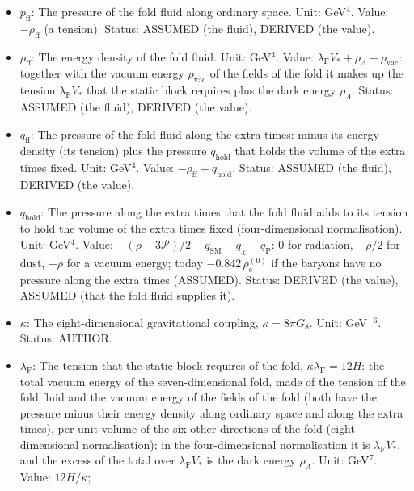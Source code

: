 \documentclass[
  10pt,
]{article}
\providecommand{\tightlist}{%
  \setlength{\itemsep}{0pt}\setlength{\parskip}{0pt}}
\begin{document}
\begin{itemize}
\tightlist
\item
  \(p_{\mathrm{ff}}\): The pressure of the fold fluid along ordinary
  space. Unit: GeV\(^4\). Value: \(-\rho_{\mathrm{ff}}\) (a tension).
  Status: ASSUMED (the fluid), DERIVED (the value).
\item
  \(\rho_{\mathrm{ff}}\): The energy density of the fold fluid. Unit:
  GeV\(^4\). Value:
  \(\lambda_{\mathrm{F}}V_* + \rho_\Lambda - \rho_{\mathrm{vac}}\):
  together with the vacuum energy \(\rho_{\mathrm{vac}}\) of the fields
  of the fold it makes up the tension \(\lambda_{\mathrm{F}}V_*\) that
  the static block requires plus the dark energy \(\rho_\Lambda\).
  Status: ASSUMED (the fluid), DERIVED (the value).
\item
  \(q_{\mathrm{ff}}\): The pressure of the fold fluid along the extra
  times: minus its energy density (its tension) plus the pressure
  \(q_{\mathrm{hold}}\) that holds the volume of the extra times fixed.
  Unit: GeV\(^4\). Value: \(-\rho_{\mathrm{ff}} + q_{\mathrm{hold}}\).
  Status: ASSUMED (the fluid), DERIVED (the value).
\item
  \(q_{\mathrm{hold}}\): The pressure along the extra times that the
  fold fluid adds to its tension to hold the volume of the extra times
  fixed (four-dimensional normalisation). Unit: GeV\(^4\). Value:
  \(-(\rho - 3\mathcal{P})/2 - q_{\mathrm{SM}} - q_\chi - q_{\mathrm{P}}\):
  0 for radiation, \(-\rho/2\) for dust, \(-\rho\) for a vacuum energy;
  today \(-0.842\,\rho_{\mathrm{c}}^{(0)}\) if the baryons have no
  pressure along the extra times (ASSUMED). Status: DERIVED (the value),
  ASSUMED (that the fold fluid supplies it).
\item
  \(\kappa\): The eight-dimensional gravitational coupling,
  \(\kappa = 8\pi G_8\). Unit: GeV\(^{-6}\). Status: AUTHOR.
\item
  \(\lambda_{\mathrm{F}}\): The tension that the static block requires
  of the fold, \(\kappa\lambda_{\mathrm{F}} = 12H\): the total vacuum
  energy of the seven-dimensional fold, made of the tension of the fold
  fluid and the vacuum energy of the fields of the fold (both have the
  pressure minus their energy density along ordinary space and along the
  extra times), per unit volume of the six other directions of the fold
  (eight-dimensional normalisation); in the four-dimensional
  normalisation it is \(\lambda_{\mathrm{F}}V_*\), and the excess of the
  total over \(\lambda_{\mathrm{F}}V_*\) is the dark energy
  \(\rho_\Lambda\). Unit: GeV\(^7\). Value: \(12H/\kappa\);

\end{itemize}
\end{document}
